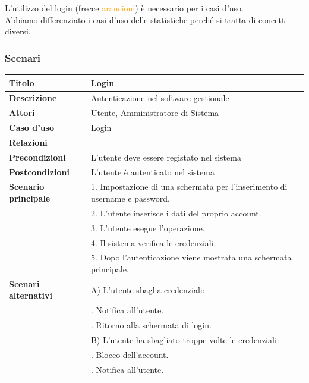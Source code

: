 \documentclass[a4paper]{article}
\begin{document}
L'utilizzo del login (frecce \textcolor{orange}{arancioni}) è necessario per i casi d'uso.\\Abbiamo differenziato i casi d'uso delle statistiche perché si tratta di concetti diversi.


\newpage

\subsubsection{Scenari}


\begin{center}
\begin{tabularx}{1\textwidth}{|l|X|}
    \hline
	\textbf{Titolo} & Login \\
	\hline
	\textbf{Descrizione} & Autenticazione nel software gestionale \\
	\hline
	\textbf{Attori} & Utente, Amministratore di Sistema \\
	\hline
	\textbf{Caso d'uso} & Login \\
	\hline
	\textbf{Relazioni} &  \\
	\hline
	\textbf{Precondizioni} & L'utente deve essere registato nel sistema \\
	\hline
	\textbf{Postcondizioni} & L'utente è autenticato nel sistema \\
	\hline
	\textbf{Scenario principale} & 1. Impostazione di una schermata per l'inserimento di username e password. \\
								 & 2. L'utente inserisce i dati del proprio account. \\
								 & 3. L'utente esegue l'operazione. \\
								 & 4. Il sistema verifica le credenziali. \\
								 & 5. Dopo l'autenticazione viene mostrata una schermata principale.\\
	\hline
	\textbf{Scenari alternativi} & A) L'utente sbaglia credenziali: \\
								 & \quad 1. Notifica all'utente.\\
								 & \quad 2. Ritorno alla schermata di login.\\
								 & B) L'utente ha sbagliato troppe volte le credenziali: \\
								 & \quad 1. Blocco dell'account.\\
								 & \quad 2. Notifica all'utente.\\

\end{tabularx}
\end{center}
\end{document}

